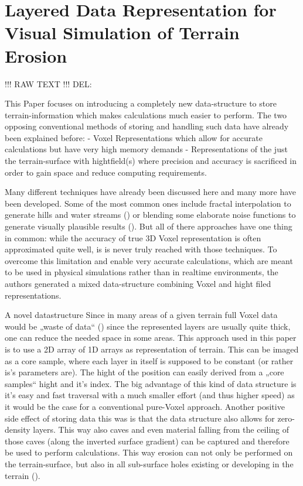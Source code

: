 \section{Layered Data Representation for Visual Simulation of Terrain Erosion}

\cite{marechal2010heat}
!!! RAW TEXT !!!
DEL: \cite{cordonnier2016large}

This Paper focuses on introducing a completely new data-structure to store terrain-information which makes calculations much easier to perform. The two opposing conventional methods of storing and handling such data have already been explained before:
- Voxel Representations which allow for accurate calculations but have very high memory demands
- Representations of the just the terrain-surface with hightfield(s) where precision and accuracy is sacrificed in order to gain space and reduce computing requirements.

Many different techniques have already been discussed here and many more have been developed. Some of the most common ones include fractal interpolation to generate hills and water streams () or blending some elaborate noise functions to generate visually plausible results (). But all of there approaches have one thing in common: while the accuracy of true 3D Voxel representation is often approximated quite well, is is never truly reached with those techniques.
To overcome this limitation and enable very accurate calculations, which are meant to be used in physical simulations rather than in realtime environments, the authors generated a mixed data-structure combining Voxel and hight filed representations.

A novel datastructure
Since in many areas of a given terrain full Voxel data would be „waste  of data“ () since the represented layers are usually quite thick, one can reduce the needed space in some areas. This approach used in this paper is to use a 2D array of 1D arrays as representation of terrain. This can be  imaged as a core sample, where each layer in itself is supposed to be constant (or rather is’s parameters are). The hight of the position can easily derived from a „core samples“ hight and it’s index.
The big advantage of this kind of data structure is it’s easy and fast traversal with a much smaller effort (and thus higher speed) as it would be the case for a conventional pure-Voxel approach. Another positive side effect of storing data this was is that the data structure also allows for zero-density layers. This way also caves and even material falling from the ceiling of those caves (along the inverted surface gradient) can be captured and therefore be used to perform calculations. This way erosion can not only be performed on the terrain-surface, but also in all sub-surface holes existing or developing in the terrain ().


